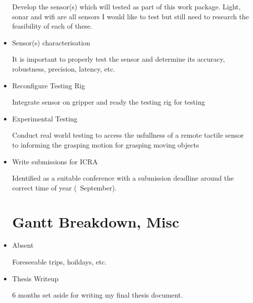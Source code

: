 \begin{itemize}
    Develop the sensor(s) which will tested as part of this work package. Light, sonar and wifi are all sensors I would like to test but still need to research the feasibility of each of these.
    \item Sensor(s) characterisation
    
    It is important to properly test the sensor and determine its accuracy, robustness, precision, latency, etc.
    \item Reconfigure Testing Rig
    
    Integrate sensor on gripper and ready the testing rig for testing
    \item Experimental Testing
    
    Conduct real world testing to access the usfullness of a remote tactile sensor to informing the grasping motion for grasping moving objects
    \item Write submissions for ICRA
    
    Identified as a suitable conference with a submission deadline around the correct time of year (~September).

    \newpage

\section{Gantt Breakdown, Misc}\label{GanttBreakdownmisc}
    \item Absent
    
    Foreseeable trips, hoildays, etc.
    \item Thesis Writeup
    
    6 months set aside for writing my final thesis document.

\end{itemize}






